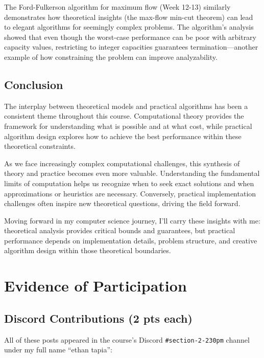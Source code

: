 \documentclass{article}
\theoremstyle{theorem}
\theoremstyle{definition}
\theoremstyle{remark}
\begin{document}
The Ford-Fulkerson algorithm for maximum flow (Week 12-13) similarly demonstrates how theoretical insights (the max-flow min-cut theorem) can lead to elegant algorithms for seemingly complex problems. The algorithm's analysis showed that even though the worst-case performance can be poor with arbitrary capacity values, restricting to integer capacities guarantees termination—another example of how constraining the problem can improve analyzability.

\subsection{Conclusion}

The interplay between theoretical models and practical algorithms has been a consistent theme throughout this course. Computational theory provides the framework for understanding what is possible and at what cost, while practical algorithm design explores how to achieve the best performance within these theoretical constraints.

As we face increasingly complex computational challenges, this synthesis of theory and practice becomes even more valuable. Understanding the fundamental limits of computation helps us recognize when to seek exact solutions and when approximations or heuristics are necessary. Conversely, practical implementation challenges often inspire new theoretical questions, driving the field forward.

Moving forward in my computer science journey, I'll carry these insights with me: theoretical analysis provides critical bounds and guarantees, but practical performance depends on implementation details, problem structure, and creative algorithm design within those theoretical boundaries.



\section{Evidence of Participation}
\subsection{Discord Contributions (2 pts each)}

All of these posts appeared in the course's Discord \texttt{\#section-2-230pm} channel under my full name “ethan tapia”:
\end{document}
